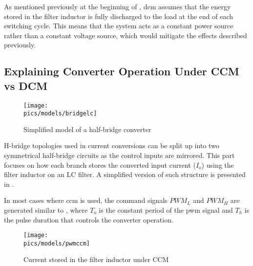 As mentioned previously at the beginning of , \gls{dcm} assumes that the energy stored in the filter inductor is fully discharged to the load at the end of each switching cycle.
This means that the system acts as a constant power source rather than a constant voltage source, which would mitigate the effects described previously.

\subsection{Explaining Converter Operation Under CCM vs DCM}
\label{subsec:ccmvsdcm}

\begin{figure}[!ht]
    \begin{center}\texttt{[image: \\pics/models/bridgelc]}\end{center}
    \caption{Simplified model of a half-bridge converter}
    \label{fig:bridgelc}
\end{figure}

\gls{H-bridge} topologies used in current conversions can be split up into two symmetrical half-bridge circuits as the control inputs are mirrored.
This part focuses on how each branch stores the converted input current ($I_o$) using the filter inductor on an LC filter.
A simplified version of such structure is presented in .

In most cases where \gls{ccm} is used, the command signals $PWM_L$ and $PWM_H$ are generated similar to , where $T_o$ is the constant period of the \gls{pwm} signal and $T_h$ is the pulse duration that controls the converter operation.
\begin{figure}[!ht]
    \begin{center}\texttt{[image: \\pics/models/pwmccm]}\end{center}
    \caption{Current stored in the filter inductor under CCM}
    \label{fig:pwmccm}
\end{figure}

